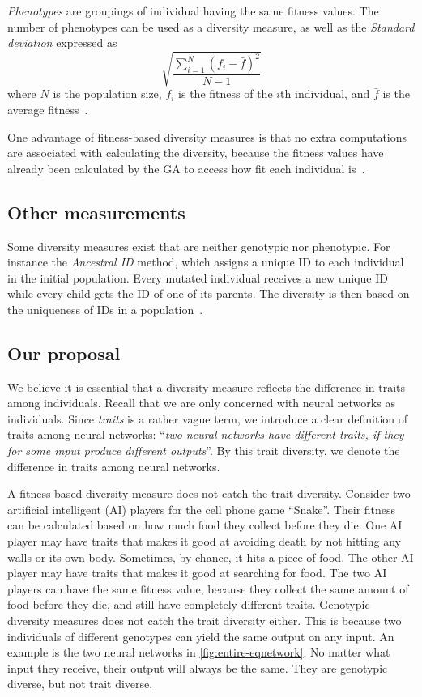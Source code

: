 \emph{Phenotypes} are groupings of individual having the same fitness values. 
The number of phenotypes can be used as a diversity measure, as well as the \emph{Standard deviation} expressed as
%
\[
  \sqrt{\frac{\sum_{i=1}^N{(f_i-\bar{f})^2}}{N-1}}
\]
%
where $N$ is the population size, $f_i$ is the fitness of the $i$th individual, and $\bar{f}$ is the average fitness~\cite{1250187}.

One advantage of fitness-based diversity measures is that no extra computations are associated with calculating the diversity, because the fitness values have already been calculated by the GA to access how fit each individual is~\cite{Nguyen:2006:ASPGP}.

\subsection{Other measurements}
Some diversity measures exist that are neither genotypic nor phenotypic. For instance the \emph{Ancestral ID} method, which assigns a unique ID to each individual in the initial population.
Every mutated individual receives a new unique ID while every child gets the ID of one of its parents.
The diversity is then based on the uniqueness of IDs in a population~\cite{1250187}.

\subsection{Our proposal}
We believe it is essential that a diversity measure reflects the difference in traits among individuals.
Recall that we are only concerned with neural networks as individuals. 
Since \emph{traits} is a rather vague term, we introduce a clear definition of traits among neural networks: ``\emph{two neural networks have different traits, if they for some input produce different outputs}''. By this trait diversity, we denote the difference in traits among neural networks.

A fitness-based diversity measure does not catch the trait diversity. Consider two artificial intelligent (AI) players for the cell phone game ``Snake''. Their fitness can be calculated based on how much food they collect before they die. One AI player may have traits that makes it good at avoiding death by not hitting any walls or its own body. Sometimes, by chance, it hits a piece of food. The other AI player may have traits that makes it good at searching for food. The two AI players can have the same fitness value, because they collect the same amount of food before they die, and still have completely different traits.
Genotypic diversity measures does not catch the trait diversity either. This is because two individuals of different genotypes can yield the same output on any input. An example is the two neural networks in \cref{fig:entire-eqnetwork}. No matter what input they receive, their output will always be the same. They are genotypic diverse, but not trait diverse.

